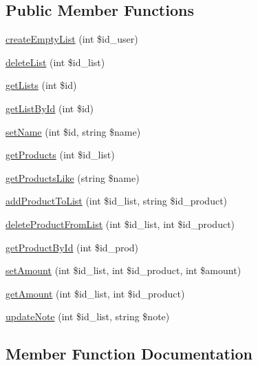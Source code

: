 \subsection*{Public Member Functions}
\begin{DoxyCompactItemize}
\item 
\hyperlink{class_shopping_list__model_af711613df11b7db405b82e41a00cbfcd}{create\+Empty\+List} (int \$id\+\_\+user)
\item 
\hyperlink{class_shopping_list__model_ae5bcc5afcc548c0e408eef17b3c7398f}{delete\+List} (int \$id\+\_\+list)
\item 
\hyperlink{class_shopping_list__model_a1e37654033d0e20491d3171e4c8a1aee}{get\+Lists} (int \$id)
\item 
\hyperlink{class_shopping_list__model_a5e244bd766fe003179871105026b35fa}{get\+List\+By\+Id} (int \$id)
\item 
\hyperlink{class_shopping_list__model_a51e2298ec742c4ef89fc2be60437a3dc}{set\+Name} (int \$id, string \$name)
\item 
\hyperlink{class_shopping_list__model_af2649dd00c4ca7db91511e2dce1b7a76}{get\+Products} (int \$id\+\_\+list)
\item 
\hyperlink{class_shopping_list__model_a1c9d4fb3435fef3e10b9aaaa8ba0a267}{get\+Products\+Like} (string \$name)
\item 
\hyperlink{class_shopping_list__model_ab632694703ad6ff436e878f20f1c1eee}{add\+Product\+To\+List} (int \$id\+\_\+list, string \$id\+\_\+product)
\item 
\hyperlink{class_shopping_list__model_a4d69ff874fe3d7cc49a9e49ae17295b1}{delete\+Product\+From\+List} (int \$id\+\_\+list, int \$id\+\_\+product)
\item 
\hyperlink{class_shopping_list__model_a95344ec0b769c9ecf4b423b54fb88c40}{get\+Product\+By\+Id} (int \$id\+\_\+prod)
\item 
\hyperlink{class_shopping_list__model_a8271bb7a9235c363295b640d4ba58a84}{set\+Amount} (int \$id\+\_\+list, int \$id\+\_\+product, int \$amount)
\item 
\hyperlink{class_shopping_list__model_a1c91e4d37b6cc18d9ffca1e9718213bb}{get\+Amount} (int \$id\+\_\+list, int \$id\+\_\+product)
\item 
\hyperlink{class_shopping_list__model_a4c9b3d77ee0eb69acead909068091079}{update\+Note} (int \$id\+\_\+list, string \$note)
\end{DoxyCompactItemize}


\subsection{Member Function Documentation}
\mbox{\label{class_shopping_list__model_ab632694703ad6ff436e878f20f1c1eee}} 
